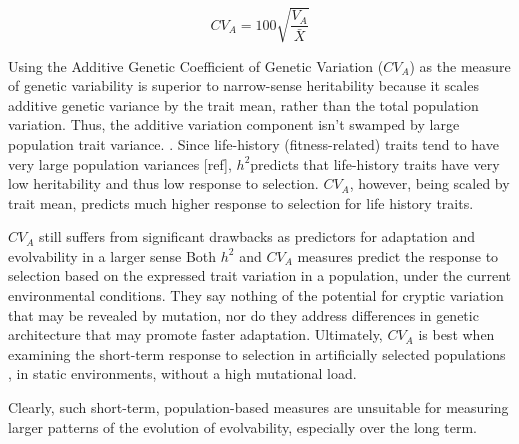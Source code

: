 \begin{equation}
CV_A = 100\sqrt{\frac{V_A}{\bar X}}
\end{equation}

Using the Additive Genetic Coefficient of Genetic Variation ($CV_A$) as the measure of genetic variability is superior to narrow-sense heritability because it scales additive genetic variance by the trait mean, rather than the total population variation. Thus, the additive variation component isn’t swamped by large population trait variance. \cite{hansen_measuring_2008}. Since life-history (fitness-related) traits tend to have very large population variances [ref], $h^2$predicts that life-history traits have very low heritability and thus low response to selection. $CV_A$, however, being scaled by trait mean, predicts much higher response to selection for life history traits. \cite{hansen_heritability_2011} \cite{houle_comparing_1992}

$CV_A$ still suffers from significant drawbacks as predictors for adaptation and evolvability in a larger sense \cite{hansen_heritability_2011} Both $h^2$ and $CV_A$ measures predict the response to selection based on the expressed trait variation in a population, under the current environmental conditions. They say nothing of the potential for cryptic variation that may be revealed by mutation, nor do they address differences in genetic architecture that may promote faster adaptation. Ultimately, $CV_A$ is best when examining the short-term response to selection in artificially selected populations \cite{houle_comparing_1992}, in static environments, without a high mutational load.

Clearly, such short-term, population-based measures are unsuitable for measuring larger patterns of the evolution of evolvability, especially over the long term.


